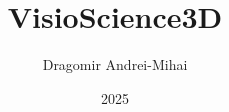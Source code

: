 \title{VisioScience3D}
\author{Dragomir Andrei-Mihai}
\date{2025}



\newcommand{\project}{MySuperProject}

